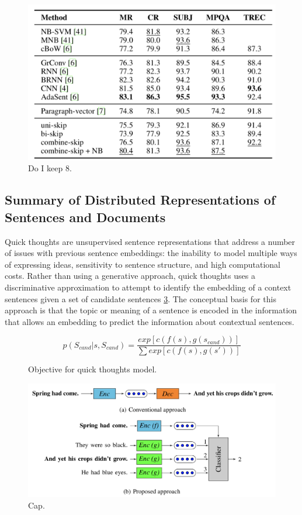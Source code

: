 \begin{figure}
\centering
  \includegraphics[width=.8\linewidth]{files/skipthoughts-8.png}
  \caption{Do I keep 8.}
  \label{fig:vae}
\end{figure}

\subsection{Summary of Distributed Representations of Sentences and Documents}

Quick thoughts  \cite{logeswaran2018an} are unsupervised sentence representations that address a number of issues with previous sentence embeddings: the inability to model multiple ways of expressing ideas,  sensitivity to sentence structure, and high computational costs. Rather than using a generative approach, quick thoughts uses a discriminative approximation to attempt to identify the embedding of a context sentences given a set of candidate sentences \ref{fig:quickthoughts-1}. The conceptual basis for this approach is that the topic or meaning of a sentence is encoded in the information that allows an embedding to predict the information about contextual sentences. 

\begin{figure}
    \centering
    $$
    p(S_{cand}|s, S_{cand}) = \frac{exp[c(f(s),g(s_{cand}))]}{\sum exp[c(f(s),g(s'))]}
    $$
    \caption{Objective for quick thoughts model.}
    \label{fig:quickthoughts-obj}
\end{figure}


\begin{figure}
\centering
  \includegraphics[width=.5\linewidth]{files/quickthoughts-1.png}
  \caption{Cap.}
  \label{fig:quickthoughts-1}
\end{figure}

